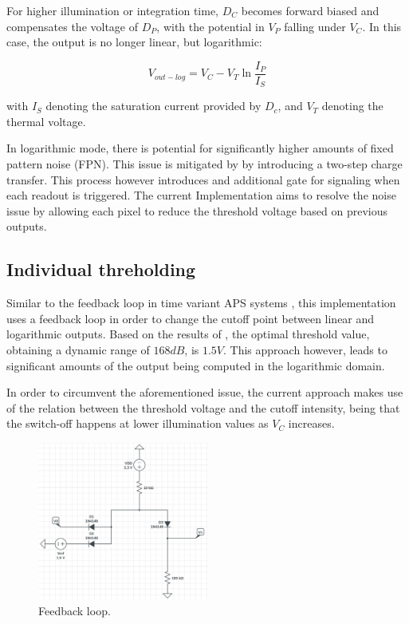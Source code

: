 For higher illumination or integration time, \(D_{C}\) becomes forward biased and compensates the voltage of \(D_{P}\),
with the potential in \(V_{P}\) falling under \(V_{C}\). In this case, the output is no longer linear, but logarithmic:

\begin{equation}
    \label{eqLogOutput}
    V_{out-log} = V_{C} - V_{T}\ln{\frac{I_{P}}{I_{S}}}
\end{equation}

with \(I_{S}\) denoting the saturation current provided by \(D_{c}\), and \(V_{T}\) denoting the thermal voltage. 

In logarithmic mode, there is potential for significantly higher amounts of fixed pattern noise (FPN). This issue
is mitigated by \cite{withTable} by introducing a two-step charge transfer. This process however introduces and additional
gate for signaling when each readout is triggered. The current Implementation aims to resolve the noise issue by
allowing each pixel to reduce the threshold voltage based on previous outputs.

\subsection{Individual threholding}

Similar to the feedback loop in time variant APS systems \cite{withTime}, this implementation uses a feedback loop
in order to change the cutoff point between linear and logarithmic outputs. Based on the results of \cite{withTable, withCompensation},
the optimal threshold value, obtaining a dynamic range of \(168dB\), is \(1.5V\). This approach however, leads
to significant amounts of the output being computed in the logarithmic domain. 

In order to circumvent the aforementioned issue, the current approach makes use of the relation between the threshold
voltage and the cutoff intensity, being that the switch-off happens at lower illumination values as \(V_{C}\) increases.

\begin{figure}[H]
    \includegraphics[width=0.50\textwidth, height=0.55\textwidth]{resources/png/minimum.png}
    \caption{Feedback loop. \label{figFeedback}}
\end{figure}

